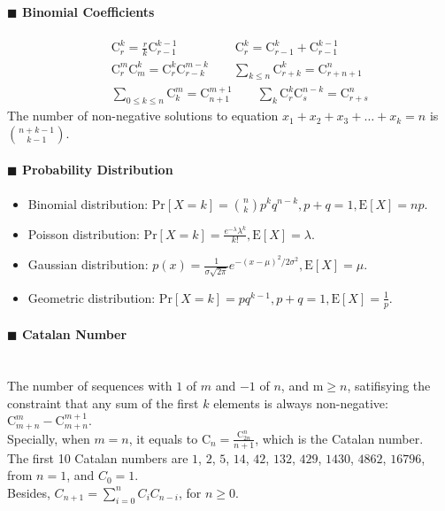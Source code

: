 \documentclass[10pt]{article}
\begin{document}
\paragraph{$\blacksquare$ Binomial Coefficients}
\begin{eqnarray*}
  && \mathrm{C}_{r}^{k}=\frac{r}{k}\mathrm{C}_{r-1}^{k-1}\qquad \qquad \: \: \: \mathrm{C}_{r}^{k}=\mathrm{C}_{r-1}^{k}+\mathrm{C}_{r-1}^{k-1} \\
  && \mathrm{C}_{r}^{m}\mathrm{C}_{m}^{k}=\mathrm{C}_{r}^{k}\mathrm{C}_{r-k}^{m-k}\qquad \sum_{k\le n}\mathrm{C}_{r+k}^{k}=\mathrm{C}_{r+n+1}^{n} \\
  && \sum_{0 \le k \le n}\mathrm{C}_{k}^{m}=\mathrm{C}_{n+1}^{m+1}\qquad \sum_{k}\mathrm{C}_{r}^{k}\mathrm{C}_{s}^{n-k}=\mathrm{C}_{r+s}^{n}
\end{eqnarray*}
The number of non-negative solutions to equation $x_1 + x_2 + x_3 + \ldots + x_k = n$ is $\binom{n+k-1}{k-1}$.
\paragraph{$\blacksquare$ Probability Distribution}
\begin{itemize}
  \item Binomial distribution:
    $\mathrm{Pr}[\mathit{X}=k]=\binom{n}{k}p^kq^{n-k}, p+q=1, \mathrm{E}[\mathit{X}]=np.$
  \item Poisson distribution:
    $\mathrm{Pr}[\mathit{X}=k]=\frac{e^{-\lambda }\lambda ^{k}}{k!}, \mathrm{E}[\mathit{X}]=\lambda .$
  \item Gaussian distribution:
    $p(x)=\frac{1}{\sigma \sqrt{2\pi }}e^{-(x-\mu)^2/2\sigma ^2}, \mathrm{E}[\mathit{X}]=\mu .$
  \item Geometric distribution:
    $\mathrm{Pr}[\mathit{X}=k]=pq^{k-1}, p+q=1, \mathrm{E}[\mathit{X}]=\frac{1}{p}.$
\end{itemize}
\paragraph{$\blacksquare$ Catalan Number}
\noindent \\
The number of sequences with $1$ of $m$ and $-1$ of $n$, and m$\ge n$, satifisying the constraint that any sum of the first $k$ elements is always non-negative: $\mathrm{C}_{m+n}^{m}-\mathrm{C}_{m+n}^{m+1}$. \\
Specially, when $m=n$, it equals to $\mathrm{C}_{n}=\frac{\mathrm{C}_{2n}^{n}}{n+1}$, which is the Catalan number. \\
The first 10 Catalan numbers are $1$, $2$, $5$, $14$, $42$, $132$, $429$, $1430$, $4862$, $16796$, from $n=1$, and $C_0=1$. \\
Besides, $C_{n+1}=\sum_{i=0}^{n}C_{i}C_{n-i}$, for $n\ge 0$.
\end{document}
